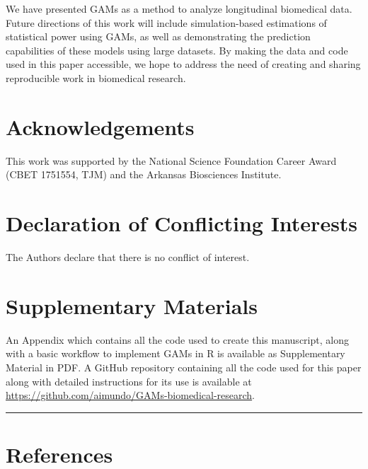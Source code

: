\documentclass[
]{article}
\begin{document}
We have presented GAMs as a method to analyze longitudinal biomedical data. Future directions of this work will include simulation-based estimations of statistical power using GAMs, as well as demonstrating the prediction capabilities of these models using large datasets.
By making the data and code used in this paper accessible, we hope to address the need of creating and sharing reproducible work in biomedical research.

\hypertarget{acknowledgements}{%
\section{Acknowledgements}\label{acknowledgements}}

This work was supported by the National Science Foundation Career Award (CBET 1751554, TJM) and the Arkansas Biosciences Institute.

\hypertarget{declaration-of-conflicting-interests}{%
\section{Declaration of Conflicting Interests}\label{declaration-of-conflicting-interests}}

The Authors declare that there is no conflict of interest.

\hypertarget{supplementary-materials}{%
\section*{Supplementary Materials}\label{supplementary-materials}}

An Appendix which contains all the code used to create this manuscript, along with a basic workflow to implement GAMs in R is available as Supplementary Material in PDF. A GitHub repository containing all the code used for this paper along with detailed instructions for its use is available at \url{https://github.com/aimundo/GAMs-biomedical-research}.

\begin{center}\rule{0.5\linewidth}{0.5pt}\end{center}

\newpage

\hypertarget{references}{%
\section{References}\label{references}}
\end{document}
